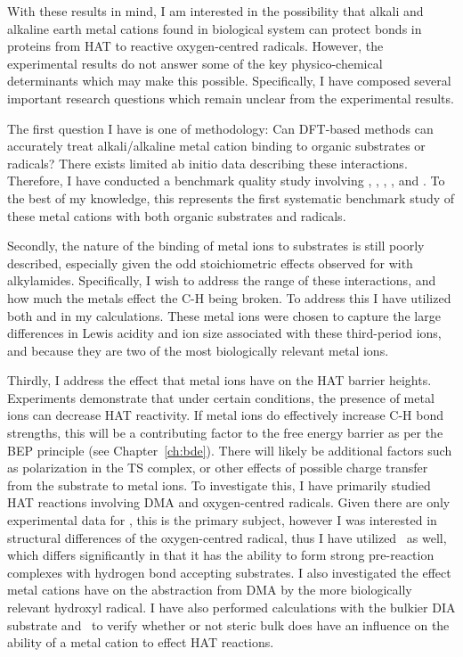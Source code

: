 With these results in mind, I am interested in the possibility that alkali and
alkaline earth metal cations found in biological system can protect 
bonds in proteins from HAT to reactive oxygen-centred radicals. However, the
experimental results do not answer some of the key physico-chemical
determinants which may make this possible. Specifically, I have composed
several important research questions which remain unclear from the experimental
results.

The first question I have is one of methodology: Can DFT-based methods can
accurately treat alkali/alkaline metal cation binding to organic substrates or
radicals? There exists limited ab initio data describing these
interactions.\cite{ Siu2001, Corral2003, Suarez2011, Baldauf2013} Therefore, I
have conducted a benchmark quality study involving , ,
, , and . To the best of my knowledge, this
represents the first systematic benchmark study of these metal cations with
both organic substrates and radicals.

Secondly, the nature of the binding of metal ions to substrates is still poorly
described, especially given the odd stoichiometric effects observed for
 with alkylamides. Specifically, I wish to address the range of
these interactions, and how much the metals effect the C-H being broken. To
address this I have utilized both  and  in my
calculations. These metal ions were chosen to capture the large differences in
Lewis acidity and ion size associated with these third-period ions, and because
they are two of the most biologically relevant metal ions.

Thirdly, I address the effect that metal ions have on the HAT barrier heights.
Experiments demonstrate that under certain conditions, the presence of metal
ions can decrease HAT reactivity. If metal ions do effectively increase C-H
bond strengths, this will be a contributing factor to the free energy barrier
as per the BEP principle\cite{Bell1936,Evans1938} (see Chapter~\ref{ch:bde}).
There will likely be additional factors such as polarization in the TS complex,
or other effects of possible charge transfer from the substrate to metal ions.
To investigate this, I have primarily studied HAT reactions involving DMA and
oxygen-centred radicals. Given there are only experimental data for \cumo, this
is the primary subject, however I was interested in structural differences of
the oxygen-centred radical, thus I have utilized \bno\ as well, which differs
significantly in that it has the ability to form strong pre-reaction complexes
with hydrogen bond accepting substrates.\cite{Salamone2012, Salamone2013} I
also investigated the effect metal cations have on the abstraction from DMA by
the more biologically relevant hydroxyl radical. I have also performed
calculations with the bulkier DIA substrate and \cumo\ to verify whether or not
steric bulk does have an influence on the ability of a metal cation to effect
HAT reactions.

